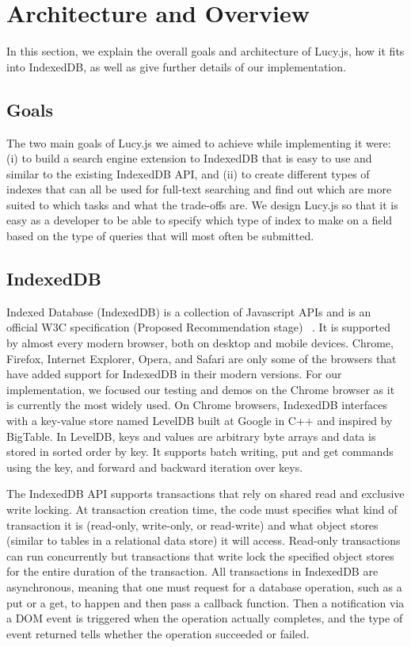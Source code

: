 \documentclass{vldb}
\begin{document}
\section{Architecture and Overview}

In this section, we explain the overall goals and architecture of Lucy.js, how it fits into IndexedDB, as well as give further details of our implementation. 

\subsection{Goals}

The two main goals of Lucy.js we aimed to achieve while implementing it were: (i) to build a search engine extension to IndexedDB that is easy to use and similar to the existing IndexedDB API, and (ii) to create different types of indexes that can all be used for full-text searching and find out which are more suited to which tasks and what the trade-offs are. We design Lucy.js so that it is easy as a developer to be able to specify which type of index to make on a field based on the type of queries that will most often be submitted.

\subsection{IndexedDB}

Indexed Database (IndexedDB) is a collection of Javascript APIs and is an official W3C specification (Proposed Recommendation stage) ~\cite{w3c}. It is supported by almost every modern browser, both on desktop and mobile devices. Chrome, Firefox, Internet Explorer, Opera, and Safari are only some of the browsers that have added support for IndexedDB in their modern versions. For our implementation, we focused our testing and demos on the Chrome browser as it is currently the most widely used.
On Chrome browsers, IndexedDB interfaces with a key-value store named LevelDB built at Google in C++ and inspired by BigTable. In LevelDB, keys and values are arbitrary byte arrays and data is stored in sorted order by key. It supports batch writing, put and get commands using the key, and forward and backward iteration over keys. 

The IndexedDB API supports transactions that rely on shared read and exclusive write locking. At transaction creation time, the code must specifies what kind of transaction it is (read-only, write-only, or read-write) and what object stores (similar to tables in a relational data store) it will access.  Read-only transactions can run concurrently but transactions that write lock the specified object stores for the entire duration of the transaction.
All transactions in IndexedDB are asynchronous, meaning that one must request for a database operation, such as a put or a get, to happen and then pass a callback function. Then a notification via a DOM event is triggered when the operation actually completes, and the type of event returned tells whether the operation succeeded or failed.
\end{document}
